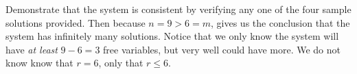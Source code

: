 Demonstrate that the system is consistent by verifying any one of the four sample solutions provided.  Then because $n=9>6=m$,  gives us the conclusion that the system has infinitely many solutions.  Notice that we only know the system will have \emph{at least} $9-6=3$ free variables, but very well could have more.  We do not know know that $r=6$, only that $r\leq 6$.